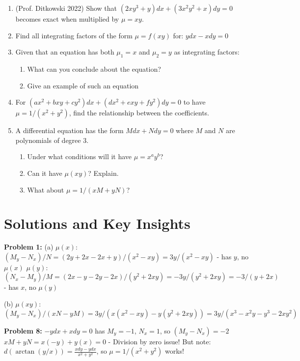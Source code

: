 \documentclass[12pt]{article}
\begin{document}
\begin{enumerate}[start=26]
\item (Prof. Ditkowski 2022) Show that $(2xy^3 + y)dx + (3x^2y^2 + x)dy = 0$ becomes exact when multiplied by $\mu = xy$.

\item Find all integrating factors of the form $\mu = f(xy)$ for:
$y dx - x dy = 0$

\item Given that an equation has both $\mu_1 = x$ and $\mu_2 = y$ as integrating factors:
\begin{enumerate}[label=(\alph*)]
    \item What can you conclude about the equation?
    \item Give an example of such an equation
\end{enumerate}

\item For $(ax^2 + bxy + cy^2)dx + (dx^2 + exy + fy^2)dy = 0$ to have $\mu = 1/(x^2 + y^2)$, find the relationship between the coefficients.

\item A differential equation has the form $M dx + N dy = 0$ where $M$ and $N$ are polynomials of degree 3.
\begin{enumerate}[label=(\alph*)]
    \item Under what conditions will it have $\mu = x^a y^b$?
    \item Can it have $\mu(xy)$? Explain.
    \item What about $\mu = 1/(xM + yN)$?
\end{enumerate}
\end{enumerate}

\section*{Solutions and Key Insights}

\textbf{Problem 1:}
(a) $\mu(x)$: $(M_y - N_x)/N = (2y + 2x - 2x + y)/(x^2 - xy) = 3y/(x^2 - xy)$ - has $y$, no $\mu(x)$
$\mu(y)$: $(N_x - M_y)/M = (2x - y - 2y - 2x)/(y^2 + 2xy) = -3y/(y^2 + 2xy) = -3/(y + 2x)$ - has $x$, no $\mu(y)$

(b) $\mu(xy)$: $(M_y - N_x)/(xN - yM) = 3y/(x(x^2 - xy) - y(y^2 + 2xy)) = 3y/(x^3 - x^2y - y^3 - 2xy^2)$

\textbf{Problem 8:}
$-y dx + x dy = 0$ has $M_y = -1$, $N_x = 1$, so $(M_y - N_x) = -2$
$xM + yN = x(-y) + y(x) = 0$ - Division by zero issue!
But note: $d(\arctan(y/x)) = \frac{x dy - y dx}{x^2 + y^2}$, so $\mu = 1/(x^2 + y^2)$ works!
\end{document}
